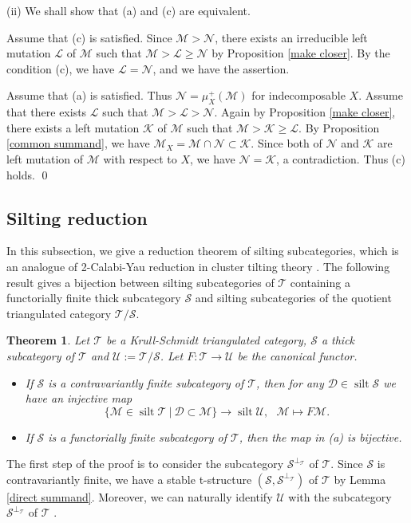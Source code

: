 \documentclass[a4paper,reqno]{amsart}
\newtheorem{theorem}{Theorem}[section]
\theoremstyle{definition}
\newcommand{\DD}{{\mathcal D}}
\newcommand{\SSS}{{\mathcal S}}
\newcommand{\UU}{{\mathcal U}}
\newcommand{\TT}{{\mathcal T}}
\newcommand{\MM}{{\mathcal M}}
\newcommand{\NN}{{\mathcal N}}
\newcommand{\KK}{{\mathcal K}}
\newcommand{\LL}{{\mathcal L}}
\newcommand{\silt}{\operatorname{silt}\nolimits}
\begin{document}
(ii) We shall show that (a) and (c) are equivalent.

Assume that (c) is satisfied.
Since $\MM>\NN$, there exists an irreducible left mutation $\LL$ of $\MM$ such that $\MM>\LL\ge\NN$
by Proposition \ref{make closer}. By the condition (c), we have $\LL=\NN$,
and we have the assertion.

Assume that (a) is satisfied. Thus $\NN=\mu_X^+(\MM)$ for indecomposable $X$.
Assume that there exists $\LL$ such that $\MM>\LL>\NN$.
Again by Proposition \ref{make closer}, there exists a left mutation
$\KK$ of $\MM$ such that $\MM>\KK\ge\LL$.
By Proposition \ref{common summand}, we have $\MM_X=\MM\cap\NN\subset\KK$.
Since both of $\NN$ and $\KK$ are left mutation of $\MM$ with respect to $X$,
we have $\NN=\KK$, a contradiction. Thus (c) holds.
\qed


\subsection{Silting reduction}
In this subsection, we give a reduction theorem of silting subcategories,
which is an analogue of 2-Calabi-Yau reduction in cluster tilting theory \cite[4.9]{IY}.
The following result gives a bijection between silting subcategories of $\TT$
containing a functorially finite thick subcategory $\SSS$ and silting subcategories of the quotient triangulated category $\TT/\SSS$.

\begin{theorem}\label{silting reduction}
Let $\TT$ be a Krull-Schmidt triangulated category, $\SSS$ a thick subcategory of $\TT$
and $\UU:=\TT/\SSS$. Let $F:\TT\to\UU$ be the canonical functor.
\begin{itemize}
\item[(a)] If $\SSS$ is a contravariantly finite subcategory of $\TT$, then for any
$\DD\in\silt\SSS$ we have an injective map
\[\{\MM\in\silt\TT\ |\ \DD\subset\MM\}\to\silt\UU,\ \ \ \MM\mapsto F\MM.\]
\item[(b)] If $\SSS$ is a functorially finite subcategory of $\TT$, then the map in (a) is bijective.
\end{itemize}
\end{theorem}

The first step of the proof is to consider the subcategory $\SSS^{\perp_{\TT}}$ of $\TT$.
Since $\SSS$ is contravariantly finite, we have a stable t-structure $(\SSS,\SSS^{\perp_{\TT}})$ of $\TT$
by Lemma \ref{direct summand}.
Moreover, we can naturally identify $\UU$ with the subcategory $\SSS^{\perp_{\TT}}$ of $\TT$ \cite{M}.
\end{document}
